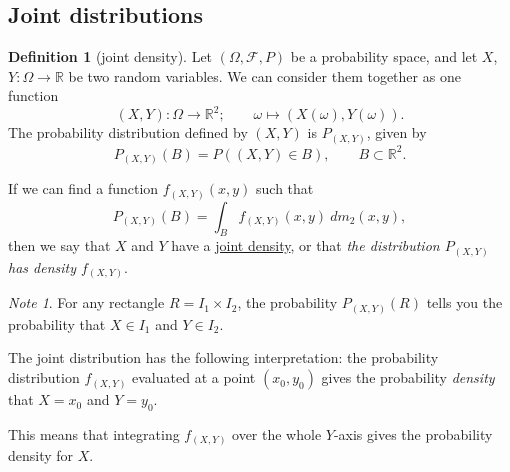 \documentclass[a4paper]{scrartcl}
\newcommand{\R}{\mathbb{R}}
\newcommand{\defn}[1]{\ul{#1}}
\theoremstyle{definition}
\newtheorem{definition}{Definition}[section]
\theoremstyle{plain}
\theoremstyle{remark}
\newtheorem{note}{Note}[section]
\begin{document}
\subsection{Joint distributions}
\begin{definition}[joint density]
  \label{def:jointdensity}
  Let $(\Omega, \mathcal{F}, P)$ be a probability space, and let $X$, $Y\colon \Omega \to \R$ be two random variables. We can consider them together as one function
  \begin{equation*}
    (X, Y)\colon \Omega \to \R^{2};\qquad \omega \mapsto (X(\omega), Y(\omega)).
  \end{equation*}
  The probability distribution defined by $(X, Y)$ is $P_{(X, Y)}$, given by
  \begin{equation*}
    P_{(X, Y)}(B) = P\left((X, Y) \in B \right),\qquad B \subset \R^{2}.
  \end{equation*}

  If we can find a function $f_{(X, Y)}(x, y)$ such that
  \begin{equation*}
    P_{(X, Y)}(B) = \int_{B} f_{(X, Y)}(x, y)\ dm_{2}(x, y),
  \end{equation*}
  then we say that $X$ and $Y$ have a \defn{joint density}, or that \emph{the distribution $P_{(X, Y)}$ has density $f_{(X, Y)}$}.
\end{definition}

\begin{note}
  For any rectangle $R = I_{1} \times I_{2}$, the probability $P_{(X, Y)}(R)$ tells you the probability that $X \in I_{1}$ and $Y \in I_{2}$.

  The joint distribution has the following interpretation: the probability distribution $f_{(X, Y)}$ evaluated at a point $(x_{0}, y_{0})$ gives the probability \emph{density} that $X = x_{0}$ and $Y = y_{0}$.

  This means that integrating $f_{(X, Y)}$ over the whole $Y$-axis gives the probability density for $X$.
\end{note}
\end{document}
